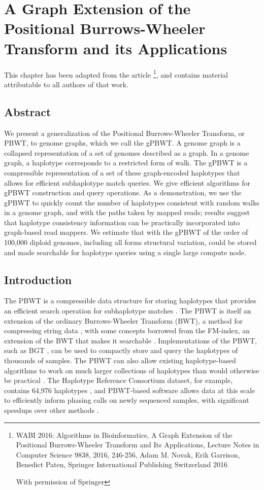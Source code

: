 \chapter{A Graph Extension of the Positional Burrows-Wheeler Transform and its Applications}
\label{ch:gpbwt}

This chapter has been adapted from the article \citet{novak2016graph}\footnote{WABI 2016: Algorithms in Bioinformatics,
A Graph Extension of the Positional Burrows-Wheeler Transform and Its Applications,
Lecture Notes in Computer Science 9838,
2016,
246-256,
Adam M. Novak, Erik Garrison, Benedict Paten,
\textcopyright{} Springer International Publishing Switzerland 2016

With permission of Springer}, and contains material attributable to all authors of that work.


\section{Abstract}
We present a generalization of the Positional Burrows-Wheeler Transform, or PBWT, to genome graphs, which we call the gPBWT. A genome graph is a collapsed representation of a set of genomes described as a graph. In a genome graph, a haplotype corresponds to a restricted form of walk. The gPBWT is a compressible representation of a set of these graph-encoded haplotypes that allows for efficient subhaplotype match queries. We give efficient algorithms for gPBWT construction and query operations.
As a demonstration, we use the gPBWT to quickly count the number of haplotypes consistent with random walks in a genome graph, and with the paths taken by mapped reads; results suggest that haplotype consistency information can be practically incorporated into graph-based read mappers. We estimate that with the gPBWT of the order of 100,000 diploid genomes, including all forms structural variation, could be stored and made searchable for haplotype queries using a single large compute node.

\section{Introduction}

The PBWT is a compressible data structure for storing haplotypes that provides an efficient search operation for subhaplotype matches \cite{durbin2014efficient}. The PBWT is itself an extension of the ordinary Burrows-Wheeler Transform (BWT), a method for compressing string data \cite{burrows1994block}, with some concepts borrowed from the FM-index, an extension of the BWT that makes it searchable \cite{ferragina2000opportunistic}. Implementations of the PBWT, such as BGT \cite{li2015bgt}, can be used to compactly store and query the haplotypes of thousands of samples. The PBWT can also allow existing haplotype-based algorithms to work on much larger collections of haplotypes than would otherwise be practical \cite{lunter2016fast}. The Haplotype Reference Consortium dataset, for example, contains 64,976 haplotypes \cite{mccarthy2016reference}, and PBWT-based software allows data at this scale to efficiently inform phasing calls on newly sequenced samples, with significant speedups over other methods \cite{loh2016reference}.


